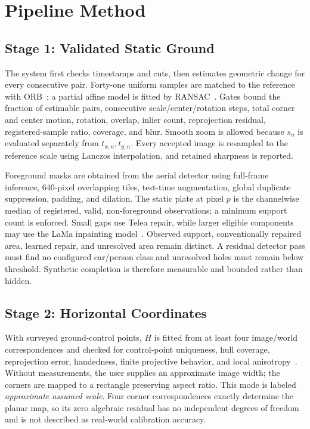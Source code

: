 \documentclass[letterpaper,conference]{IEEEtran}
\begin{document}
\section{Pipeline Method}
\subsection{Stage 1: Validated Static Ground}
The system first checks timestamps and cuts, then estimates geometric change for every consecutive pair. Forty-one uniform samples are matched to the reference with ORB~\cite{rublee2011orb}; a partial affine model is fitted by RANSAC~\cite{fischler1981ransac}. Gates bound the fraction of estimable pairs, consecutive scale/center/rotation steps, total corner and center motion, rotation, overlap, inlier count, reprojection residual, registered-sample ratio, coverage, and blur. Smooth zoom is allowed because $s_n$ is evaluated separately from $t_{x,n},t_{y,n}$. Every accepted image is resampled to the reference scale using Lanczos interpolation, and retained sharpness is reported.

Foreground masks are obtained from the aerial detector using full-frame inference, 640-pixel overlapping tiles, test-time augmentation, global duplicate suppression, padding, and dilation. The static plate at pixel $p$ is the channelwise median of registered, valid, non-foreground observations; a minimum support count is enforced. Small gaps use Telea repair, while larger eligible components may use the LaMa inpainting model~\cite{suvorov2022lama}. Observed support, conventionally repaired area, learned repair, and unresolved area remain distinct. A residual detector pass must find no configured car/person class and unresolved holes must remain below threshold. Synthetic completion is therefore measurable and bounded rather than hidden.

\subsection{Stage 2: Horizontal Coordinates}
With surveyed ground-control points, $H$ is fitted from at least four image/world correspondences and checked for control-point uniqueness, hull coverage, reprojection error, handedness, finite projective behavior, and local anisotropy~\cite{hartley2004multiple}. Without measurements, the user supplies an approximate image width; the corners are mapped to a rectangle preserving aspect ratio. This mode is labeled \emph{approximate assumed scale}. Four corner correspondences exactly determine the planar map, so its zero algebraic residual has no independent degrees of freedom and is not described as real-world calibration accuracy.
\end{document}
